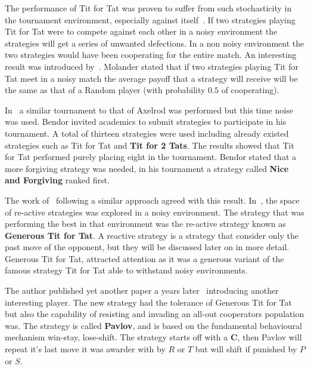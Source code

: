 \documentclass{article}
\begin{document}
The performance of Tit for Tat was proven to suffer from such stochasticity in
the tournament environment, especially against itself~\cite{Bendor1991,Godfray1992,
Molander1985, Nowak1992, Wolfgang2006}. If two strategies playing Tit for Tat were
to compete against each other in a noisy environment the strategies will get 
a series of unwanted defections. In a non noisy environment
the two strategies would have been cooperating for the entire match.
An interesting result was introduced by~\cite{Molander1985}. Molander stated
that if two strategies playing Tit for Tat meet in a noisy match the average
payoff that a strategy will receive will be the same as that of a Random player
(with probability \(0.5\) of cooperating). 

In~\cite{Bendor1991} a similar tournament to that of Axelrod was performed 
but this time noise was used. Bendor invited academics to submit strategies 
to participate in his tournament. A total of thirteen strategies were used 
including already existed strategies such as Tit for Tat and \textbf{Tit for 2 
Tats}. The results showed that Tit for Tat performed purely placing eight in
the tournament. Bendor stated that a more forgiving strategy was needed, in his
tournament a strategy called \textbf{Nice and Forgiving} ranked first.

The work of~\cite{Nowak1992} following a similar approach agreed with this result.
In~\cite{Nowak1992}, the space of re-active strategies was explored in a noisy
environment. The strategy that was performing the best in that environment was
the re-active strategy known as \textbf{Generous Tit for Tat}. A reactive 
strategy is a strategy that consider only the past move of the opponent, but 
they will be discussed later on in more detail. Generous Tit for Tat, attracted
attention as it was a generous variant of the famous strategy Tit for Tat able
to withstand noisy environments.

The author published yet another paper a years later~\cite{Nowak1993} introducing another
interesting player. The new strategy had the tolerance of Generous Tit for Tat 
but also the capability of resisting and invading an all-out cooperators population
was. The strategy is called \textbf{Pavlov},
and is based on the fundamental behavioural mechanism win-stay, lose-shift.
The strategy starts off with a \textbf{C}, then Pavlov will repeat it's last
move it was awarder with by \(R\) or \(T\) but will shift if punished by \(P\) or
\(S\).

\end{document}
